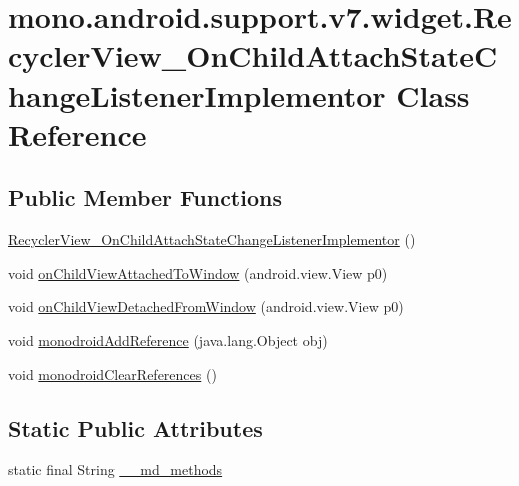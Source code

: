 \hypertarget{classmono_1_1android_1_1support_1_1v7_1_1widget_1_1_recycler_view___on_child_attach_state_change_listener_implementor}{
\section{mono.android.support.v7.widget.RecyclerView\_\-OnChildAttachStateChangeListenerImplementor Class Reference}
\label{classmono_1_1android_1_1support_1_1v7_1_1widget_1_1_recycler_view___on_child_attach_state_change_listener_implementor}
}
\subsection*{Public Member Functions}
\begin{CompactItemize}
\item 
\hyperlink{classmono_1_1android_1_1support_1_1v7_1_1widget_1_1_recycler_view___on_child_attach_state_change_listener_implementor_22267a9c06f24536b20977a2da30e96c}{RecyclerView\_\-OnChildAttachStateChangeListenerImplementor} ()
\item 
void \hyperlink{classmono_1_1android_1_1support_1_1v7_1_1widget_1_1_recycler_view___on_child_attach_state_change_listener_implementor_debfa7ea1dc476b00843dfd0752671ed}{onChildViewAttachedToWindow} (android.view.View p0)
\item 
void \hyperlink{classmono_1_1android_1_1support_1_1v7_1_1widget_1_1_recycler_view___on_child_attach_state_change_listener_implementor_f970163379808ec9a1e6bc73356a3d39}{onChildViewDetachedFromWindow} (android.view.View p0)
\item 
void \hyperlink{classmono_1_1android_1_1support_1_1v7_1_1widget_1_1_recycler_view___on_child_attach_state_change_listener_implementor_2cc613938339013be1dc352e67471797}{monodroidAddReference} (java.lang.Object obj)
\item 
void \hyperlink{classmono_1_1android_1_1support_1_1v7_1_1widget_1_1_recycler_view___on_child_attach_state_change_listener_implementor_c8afdd86efc6fd6f205811277b854a49}{monodroidClearReferences} ()
\end{CompactItemize}
\subsection*{Static Public Attributes}
\begin{CompactItemize}
\item 
static final String \hyperlink{classmono_1_1android_1_1support_1_1v7_1_1widget_1_1_recycler_view___on_child_attach_state_change_listener_implementor_aa15da75df7533f4e3467fa457218139}{\_\-\_\-md\_\-methods}
\end{CompactItemize}
